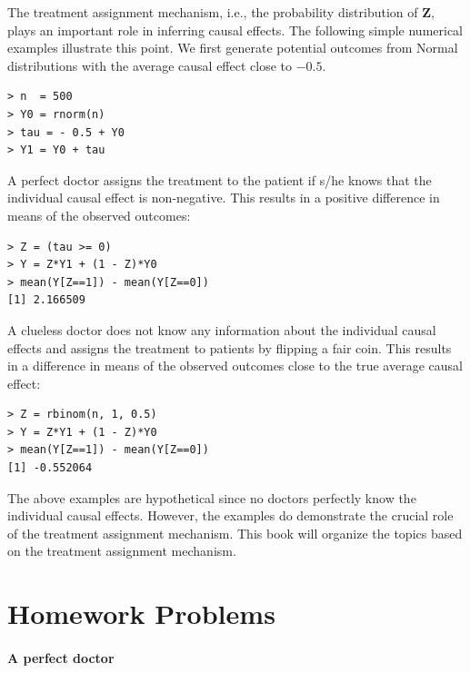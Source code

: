 The treatment assignment mechanism, i.e., the probability distribution of $\bm{Z} $, plays an important role in inferring causal effects. The following simple numerical examples illustrate this point. We first generate potential outcomes from Normal distributions with the average causal effect close to $-0.5$. 
\begin{lstlisting}
> n  = 500
> Y0 = rnorm(n)
> tau = - 0.5 + Y0
> Y1 = Y0 + tau
\end{lstlisting} 
A perfect doctor assigns the treatment to the patient if s/he knows that the individual causal effect is non-negative. This results in a positive difference in means of the observed outcomes: 
\begin{lstlisting}
> Z = (tau >= 0)
> Y = Z*Y1 + (1 - Z)*Y0
> mean(Y[Z==1]) - mean(Y[Z==0])
[1] 2.166509
\end{lstlisting} 
A clueless doctor does not know any information about the individual causal effects and assigns the treatment to patients by flipping a fair coin. This results in a difference in means of the observed outcomes close to the true average causal effect: 
\begin{lstlisting}
> Z = rbinom(n, 1, 0.5)
> Y = Z*Y1 + (1 - Z)*Y0
> mean(Y[Z==1]) - mean(Y[Z==0])
[1] -0.552064 
  \end{lstlisting} 
  
 The above examples are hypothetical since no doctors perfectly know the individual causal effects. However, the examples do demonstrate the crucial role of the treatment assignment mechanism. This book will organize the topics based on the treatment assignment mechanism. 




 
\section{Homework Problems}



\paragraph{A perfect doctor}
\label{hw::perfect-doctor}

